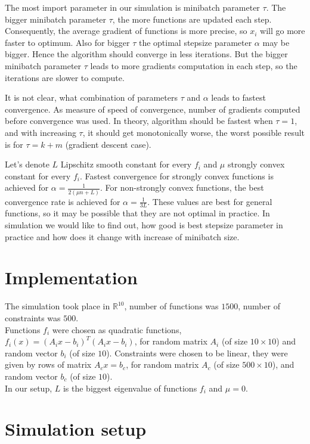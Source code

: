 \documentclass[11pt]{book}
\newcommand{\R}{\mathbb{R}}
\begin{document}
The most import parameter in our simulation is minibatch parameter $\tau$. The bigger minibatch parameter $\tau$, the more functions are updated each step. Consequently, the average gradient of functions is more precise, so $x_i$ will go more faster to optimum. Also for bigger $\tau$ the optimal stepsize parameter $\alpha$ may be bigger. Hence the algorithm should converge in less iterations. But the bigger minibatch parameter $\tau$ leads to more gradients computation in each step, so the iterations are slower to compute.

It is not clear, what combination of parameters $\tau$ and $\alpha$ leads to fastest convergence. As measure of speed of convergence, number of gradients computed before convergence was used. In theory, algorithm should be fastest when $\tau=1$, and with increasing $\tau$, it should get monotonically worse, the worst possible result is for $\tau = k+m$ (gradient descent case).

Let's denote $L$ Lipschitz smooth constant for every $f_i$ and $\mu$ strongly convex constant for every $f_i$. Fastest convergence for strongly convex functions is achieved for $\alpha = \frac{1}{2(\mu n + L)}$. For non-strongly convex functions, the best convergence rate is achieved for $\alpha = \frac{1}{3L}$. These values are best for general functions, so it may be possible that they are not optimal in practice. In simulation we would like to find out, how good is best stepsize parameter in practice and how does it change with increase of minibatch size.


\section{Implementation}

The simulation took place in $\R^{10}$, number of functions was $1500$, number of constraints was $500$.\\

Functions $f_i$ were chosen as quadratic functions, $f_i(x) = (A_ix-b_i)^T(A_ix-b_i)$, for random matrix $A_i$ (of size $10 \times 10$) and random vector $b_i$ (of size $10$). Constraints were chosen to be linear, they were given by rows of matrix $A_cx=b_c$, for random matrix $A_c$ (of size $500 \times 10$), and random vector $b_c$ (of size $10$).\\

In our setup, $L$ is the biggest eigenvalue of functions $f_i$ and $\mu=0$.

\section{Simulation setup}
\end{document}
